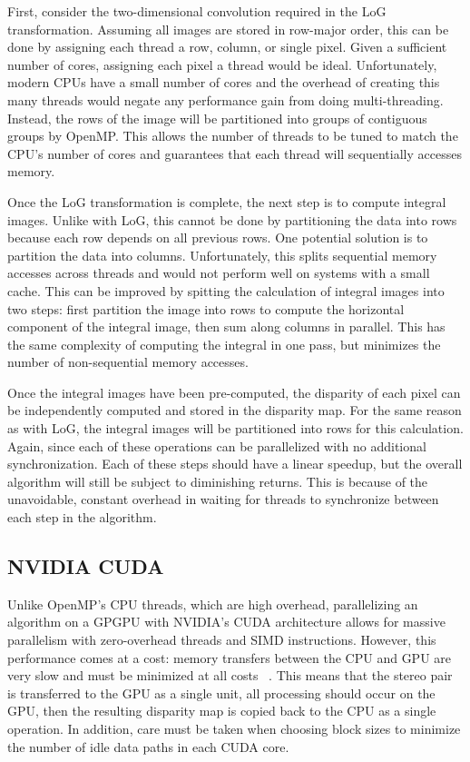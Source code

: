 \documentclass{article}
\begin{document}
First, consider the two-dimensional convolution required in the LoG
transformation. Assuming all images are stored in row-major order, this can be
done by assigning each thread a row, column, or single pixel. Given a
sufficient number of cores, assigning each pixel a thread would be ideal.
Unfortunately, modern CPUs have a small number of cores and the overhead of
creating this many threads would negate any performance gain from doing
multi-threading. Instead, the rows of the image will be partitioned into groups
of contiguous groups by OpenMP. This allows the number of threads to be tuned
to match the CPU's number of cores and guarantees that each thread will
sequentially accesses memory.

Once the LoG transformation is complete, the next step is to compute integral
images. Unlike with LoG, this cannot be done by partitioning the data into rows
because each row depends on all previous rows. One potential solution is to
partition the data into columns. Unfortunately, this splits sequential memory
accesses across threads and would not perform well on systems with a small
cache. This can be improved by spitting the calculation of integral images into
two steps: first partition the image into rows to compute the horizontal
component of the integral image, then sum along columns in parallel. This has
the same complexity of computing the integral in one pass, but minimizes the
number of non-sequential memory accesses.

Once the integral images have been pre-computed, the disparity of each pixel
can be independently computed and stored in the disparity map. For the same
reason as with LoG, the integral images will be partitioned into rows for this
calculation. Again, since each of these operations can be parallelized with no
additional synchronization. Each of these steps should have a linear speedup,
but the overall algorithm will still be subject to diminishing returns. This is
because of the unavoidable, constant overhead in waiting for threads to
synchronize between each step in the algorithm.

\subsection{NVIDIA CUDA}
\label{sec:parallel-cuda}
Unlike OpenMP's CPU threads, which are high overhead, parallelizing an
algorithm on a GPGPU with NVIDIA's CUDA architecture allows for massive
parallelism with zero-overhead threads and SIMD instructions.  However, this
performance comes at a cost: memory transfers between the CPU and GPU are very
slow and must be minimized at all costs ~\cite{cuda}. This means that the
stereo pair is transferred to the GPU as a single unit, all processing should
occur on the GPU, then the resulting disparity map is copied back to the CPU as
a single operation. In addition, care must be taken when choosing block sizes
to minimize the number of idle data paths in each CUDA core.
\end{document}
